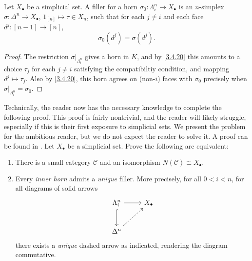 \begin{corollary}\label{3.4.22}
	Let $X_{\bullet} $ be a simplicial set. A filler for a horn $\sigma_0:\Lambda_i^n\to X_{\bullet} $ is an $n$-simplex $\sigma : \Delta^n \to X_{\bullet} $, $1_{[n]} \mapsto \tau\in X_n$, such that for each $j\neq i$ and each face $d^j : [n-1] \to [n]$,
			\[
				\sigma_0(d^j)=\sigma(d^j)
			.\]	
\end{corollary}
\begin{proof}
	The restriction $\sigma|_{\Lambda_i^n}$ gives a horn in $K$, and by \cref{3.4.20} this amounts to a choice $\tau_j$ for each $j\neq i$ satisfying the compatibiltiy condition, and mapping $d^j \mapsto \tau_j$. Also by \cref{3.4.20}, this horn agrees on (non-$i$) faces with $\sigma_0$ precisely when $\sigma|_{\Lambda_i^n} = \sigma_0$.
\end{proof}

\begin{exercise}[Challenge]\label{3.4.23}
	Technically, the reader now has the necessary knowledge to complete the following proof. This proof is fairly nontrivial, and the reader will likely struggle, especially if this is their first exposure to simplicial sets. We present the problem for the ambitious reader, but we do not expect the reader to solve it. A proof can be found in \cite[Prop.~1.1.2.2]{htt}. Let $X_{\bullet} $ be a simplicial set. Prove the following are equivalent:
	\begin{enumerate}
		\item There is a small category $\mathcal{C} $ and an isomorphism $N(\mathcal{C} )\cong X_{\bullet} $.
		\item Every \emph{inner horn} admits a \emph{unique} filler. More precisely, for all $0<i<n$, for all diagrams of solid arrows
			\[\begin{tikzcd}[row sep = 2.5em, column sep = 2.5em]
			\Lambda_i^n \ar[r] \ar[hook, d]  & X_{\bullet}  \\
			\Delta^n \ar[dashed, ur]  & 
			\end{tikzcd}\]
			there exists a \emph{unique} dashed arrow as indicated, rendering the diagram commutative.
	\end{enumerate}
\end{exercise}

